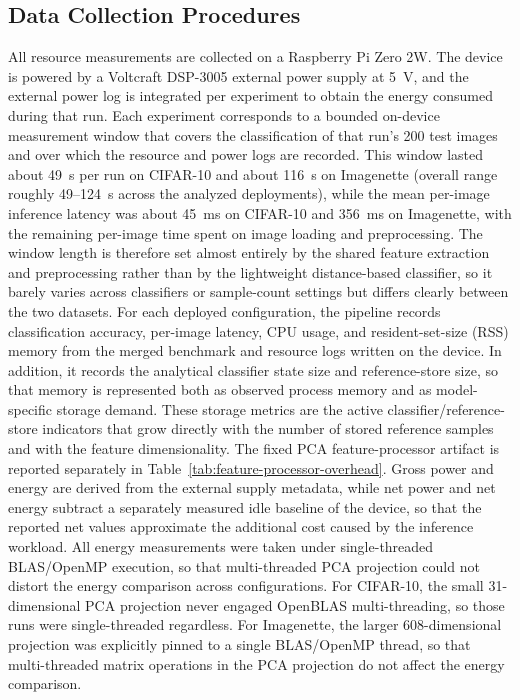 \documentclass[sigconf,review,nonacm]{acmart}
\begin{document}
\subsection{Data Collection Procedures}
\label{sec:measurement}
All resource measurements are collected on a Raspberry Pi Zero 2W.
The device is powered by a Voltcraft DSP-3005 external power supply at 5~V, and the external power log is integrated per experiment to obtain the energy consumed during that run.
Each experiment corresponds to a bounded on-device measurement window that covers the classification of that run's 200 test images and over which the resource and power logs are recorded.
This window lasted about 49~s per run on CIFAR-10 and about 116~s on Imagenette (overall range roughly 49--124~s across the analyzed deployments), while the mean per-image inference latency was about 45~ms on CIFAR-10 and 356~ms on Imagenette, with the remaining per-image time spent on image loading and preprocessing.
The window length is therefore set almost entirely by the shared feature extraction and preprocessing rather than by the lightweight distance-based classifier, so it barely varies across classifiers or sample-count settings but differs clearly between the two datasets.
For each deployed configuration, the pipeline records classification accuracy, per-image latency, CPU usage, and resident-set-size (RSS) memory from the merged benchmark and resource logs written on the device.
In addition, it records the analytical classifier state size and reference-store size, so that memory is represented both as observed process memory and as model-specific storage demand.
These storage metrics are the active classifier/reference-store indicators that grow directly with the number of stored reference samples and with the feature dimensionality. The fixed PCA feature-processor artifact is reported separately in Table~\ref{tab:feature-processor-overhead}.
Gross power and energy are derived from the external supply metadata, while net power and net energy subtract a separately measured idle baseline of the device, so that the reported net values approximate the additional cost caused by the inference workload.
All energy measurements were taken under single-threaded BLAS/OpenMP execution, so that multi-threaded PCA projection could not distort the energy comparison across configurations. For CIFAR-10, the small 31-dimensional PCA projection never engaged OpenBLAS multi-threading, so those runs were single-threaded regardless. For Imagenette, the larger 608-dimensional projection was explicitly pinned to a single BLAS/OpenMP thread, so that multi-threaded matrix operations in the PCA projection do not affect the energy comparison.
\end{document}
